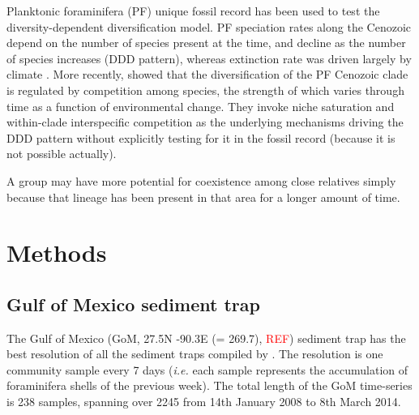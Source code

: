 \documentclass[a4paper]{article}
\begin{document}
Planktonic foraminifera (PF) unique fossil record has been used to test the diversity-dependent diversification model. PF speciation rates along the Cenozoic depend on the number of species present at the time, and decline as the number of species increases (DDD pattern), whereas extinction rate was driven largely by climate \cite{ezard2011interplay}. %
More recently, \cite{ezard2016ecolet} showed that the diversification of the PF Cenozoic clade is regulated by competition among species, the strength of which varies through time as a function of environmental change. They invoke niche saturation and within-clade interspecific competition as the underlying mechanisms driving the DDD pattern without explicitly testing for it in the fossil record (because it is not possible actually).

A group may have more potential for coexistence among close relatives simply because that lineage has been present in that area for a longer amount of time.



\section{Methods}
\label{sec:methods}

\subsection{Gulf of Mexico sediment trap}
The Gulf of Mexico (GoM, 27.5N -90.3E (= 269.7), \textcolor{red}{REF}) sediment trap has the best resolution of all the sediment traps compiled by \cite{jonkers2015global}. The resolution is one community sample every 7 days (\textit{i.e.} each sample represents the accumulation of foraminifera shells of the previous week). The total length of the GoM time-series is 238 samples, spanning over 2245 from 14th January 2008 to 8th March 2014.
\end{document}
